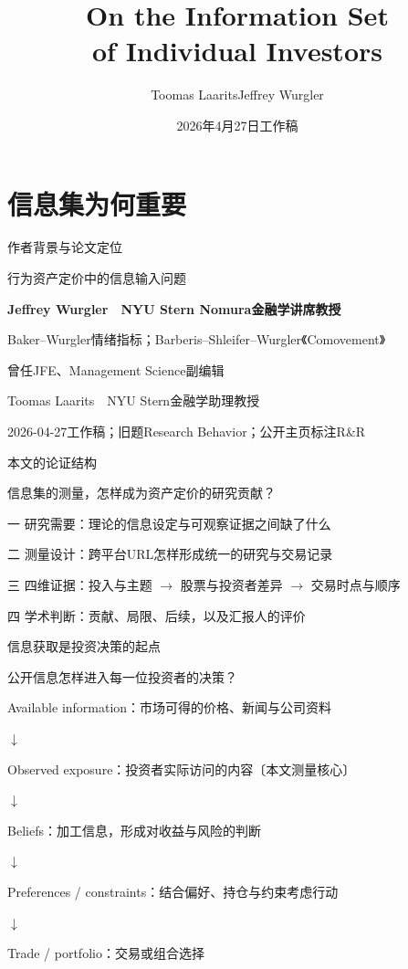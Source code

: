 \documentclass[11pt,compress]{beamer}
\title[个体投资者的信息集]{On the Information Set\\of Individual Investors}
\author[Laarits \& Wurgler]{Toomas Laarits\quad Jeffrey Wurgler}
\institute[NYU Stern]{NYU Stern School of Business}
\date{2026年4月27日工作稿}
\begin{document}
\section{信息集为何重要}
\begin{frame}[plain]\titlepage\end{frame}
\begin{frame}{作者背景与论文定位}\relax
{\small\color{tsinghua}行为资产定价中的信息输入问题\par}\medskip
{\large\textbf{Jeffrey Wurgler　NYU Stern Nomura金融学讲席教授}}\par\medskip
{\small Baker–Wurgler情绪指标；Barberis–Shleifer–Wurgler《Comovement》}\par\medskip
{\small 曾任JFE、Management Science副编辑}\par\medskip
{\small Toomas Laarits　NYU Stern金融学助理教授}\par\medskip
{\small 2026-04-27工作稿；旧题Research Behavior；公开主页标注R\&R}\par\medskip
{}
\end{frame}
\begin{frame}{本文的论证结构}\relax
{\small\color{tsinghua}信息集的测量，怎样成为资产定价的研究贡献？\par}\medskip
一 研究需要：理论的信息设定与可观察证据之间缺了什么\par\medskip
二 测量设计：跨平台URL怎样形成统一的研究与交易记录\par\medskip
三 四维证据：投入与主题 \(\rightarrow\) 股票与投资者差异 \(\rightarrow\) 交易时点与顺序\par\medskip
四 学术判断：贡献、局限、后续，以及汇报人的评价\par\medskip
\end{frame}
\begin{frame}{信息获取是投资决策的起点}\relax
{\small\color{tsinghua}公开信息怎样进入每一位投资者的决策？\par}\medskip
Available information：市场可得的价格、新闻与公司资料\par
{\color{tsinghua}\(\downarrow\)}\par
\alert{Observed exposure：投资者实际访问的内容〔本文测量核心〕}\par
{\color{tsinghua}\(\downarrow\)}\par
Beliefs：加工信息，形成对收益与风险的判断\par
{\color{tsinghua}\(\downarrow\)}\par
Preferences / constraints：结合偏好、持仓与约束考虑行动\par
{\color{tsinghua}\(\downarrow\)}\par
Trade / portfolio：交易或组合选择\par
{}
\end{frame}
\end{document}
